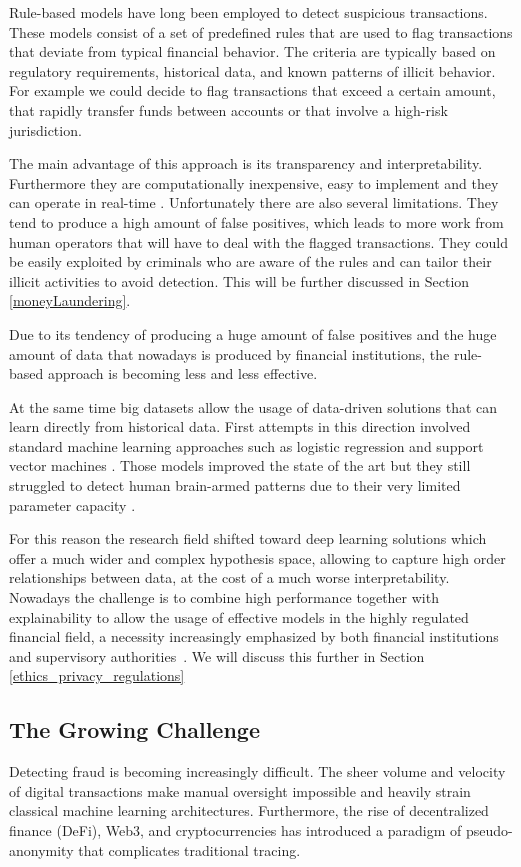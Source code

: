 Rule-based models have long been employed to detect suspicious transactions. These models consist of a set of predefined rules that are used to flag transactions that deviate from typical financial behavior.
The criteria are typically based on regulatory requirements, historical data, and known patterns of illicit behavior. For example we could decide to flag transactions that exceed a certain amount, that rapidly transfer funds between accounts or that involve a high-risk jurisdiction.

The main advantage of this approach is its transparency and interpretability. Furthermore they are computationally inexpensive, easy to implement and they can operate in real-time \cite{ruleBased}. 
Unfortunately there are also several limitations. They tend to produce a high amount of false positives, which leads to more work from human operators that will have to deal with the flagged transactions. They could be easily exploited by criminals who are aware of the rules and can tailor their illicit activities to avoid detection. This will be further discussed in Section \ref{moneyLaundering}.

Due to its tendency of producing a huge amount of false positives and the huge amount of data that nowadays is produced by financial institutions, the rule-based approach is becoming less and less effective.

At the same time big datasets allow the usage of data-driven solutions that can learn directly from historical data.
First attempts in this direction involved standard machine learning approaches such as logistic regression and support vector machines \cite{standardlearning}. Those models improved the state of the art but they still struggled to detect human brain-armed patterns due to their very limited parameter capacity \cite{mainpaper}.

For this reason the research field shifted toward deep learning solutions which offer a much wider and complex hypothesis space, allowing to capture high order relationships between data, at the cost of a much worse interpretability. Nowadays the challenge is to combine high performance together with explainability to allow the usage of effective models in the highly regulated financial field, a necessity increasingly emphasized by both financial institutions and supervisory authorities~\cite{kuiper2021exploring}. We will discuss this further in Section \ref{ethics_privacy_regulations}

\subsection{The Growing Challenge}
Detecting fraud is becoming increasingly difficult. The sheer volume and velocity of digital transactions make manual oversight impossible and heavily strain classical machine learning architectures. Furthermore, the rise of decentralized finance (DeFi), Web3, and cryptocurrencies has introduced a paradigm of pseudo-anonymity that complicates traditional tracing.

